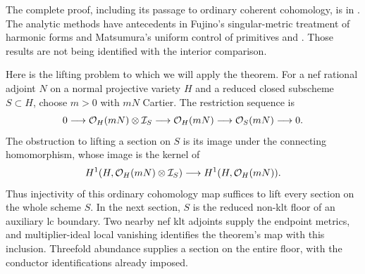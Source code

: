 The complete proof, including its passage to ordinary coherent
cohomology, is in \cite[Theorem~1.2]{OpenAIMetrics2026}. The analytic methods have antecedents
in Fujino's singular-metric treatment of harmonic forms and Matsumura's
uniform control of primitives \cite[Theorem~1.2 and Lemmas~3.1--3.2]
{FujinoInjectivity2012} and \cite[Theorems~1.3 and~5.9]{Matsumura2018}.
Those results are not being identified with the interior comparison.

Here is the lifting problem to which we will apply the theorem.
For a nef rational adjoint $N$ on a normal projective variety $H$
and a reduced closed subscheme $S\subset H$, choose $m>0$ with
$mN$ Cartier. The restriction sequence is
\[
 0\longrightarrow\mathcal O_H(mN)\otimes\mathcal I_S
 \longrightarrow\mathcal O_H(mN)
 \longrightarrow\mathcal O_S(mN)\longrightarrow0.
\]
The obstruction to lifting a section on $S$ is its image under the
connecting homomorphism, whose image is the kernel of
\[
 H^1(H,\mathcal O_H(mN)\otimes\mathcal I_S)
 \longrightarrow H^1(H,\mathcal O_H(mN)).
\]
Thus injectivity of this ordinary cohomology map suffices to lift
every section on the whole scheme $S$. In the next section, $S$ is
the reduced non-klt floor of an auxiliary lc boundary. Two nearby
nef klt adjoints supply the endpoint metrics, and multiplier-ideal
local vanishing identifies the theorem's map with this inclusion.
Threefold abundance supplies a section on the entire floor, with
the conductor identifications already imposed.
